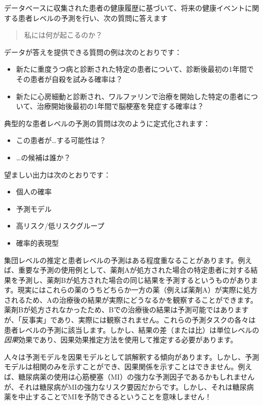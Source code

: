 \documentclass[
  11pt]{book}
\makeatletter
\providecommand{\tightlist}{%
  \setlength{\itemsep}{0pt}\setlength{\parskip}{0pt}}
\newenvironment{kframe}{%
\medskip{}
\setlength{\fboxsep}{.8em}
 \def\at@end@of@kframe{}%
 \ifinner\ifhmode%
  \def\at@end@of@kframe{\end{minipage}}%
  \begin{minipage}{\columnwidth}%
 \fi\fi%
 \def\FrameCommand##1{\hskip\@totalleftmargin \hskip-\fboxsep
 \colorbox{myShadeColor}{##1}\hskip-\fboxsep
     \hskip-\linewidth \hskip-\@totalleftmargin \hskip\columnwidth}%
 \MakeFramed {\advance\hsize-\width
   \@totalleftmargin\z@ \linewidth\hsize
   \@setminipage}}%
 {\par\unskip\endMakeFramed%
 \at@end@of@kframe}
\newenvironment{rmdblock}[1]
  {
  \begin{itemize}
  \renewcommand{\labelitemi}{
    \raisebox{-.7\height}[0pt][0pt]{
      {\setkeys{Gin}{width=3em,keepaspectratio}\texttt{[image: images/\#1]}}
    }
  }
  \setlength{\fboxsep}{1em}
  \begin{kframe}
  \item
  }
  {
  \end{kframe}
  \end{itemize}
  }
\newenvironment{rmdimportant}
  {\begin{rmdblock}{important}}
  {\end{rmdblock}}
\theoremstyle{definition}
\theoremstyle{definition}
\theoremstyle{definition}
\theoremstyle{definition}
\theoremstyle{remark}
\makeatother
\begin{document}

データベースに収集された患者の健康履歴に基づいて、将来の健康イベントに関する患者レベルの予測を行い、次の質問に答えます

\begin{quote}
私には何が起こるのか？
\end{quote}

データが答えを提供できる質問の例は次のとおりです：

\begin{itemize}
\tightlist
\item
  新たに重度うつ病と診断された特定の患者について、診断後最初の1年間でその患者が自殺を試みる確率は？
\item
  新たに心房細動と診断され、ワルファリンで治療を開始した特定の患者について、治療開始後最初の1年間で脳梗塞を発症する確率は？
\end{itemize}

典型的な患者レベルの予測の質問は次のように定式化されます：

\begin{itemize}
\tightlist
\item
  この患者が\ldots する可能性は？
\item
  \ldots の候補は誰か？
\end{itemize}

望ましい出力は次のとおりです：

\begin{itemize}
\tightlist
\item
  個人の確率
\item
  予測モデル
\item
  高リスク/低リスクグループ
\item
  確率的表現型
\end{itemize}

集団レベルの推定と患者レベルの予測はある程度重なることがあります。例えば、重要な予測の使用例として、薬剤Aが処方された場合の特定患者に対する結果を予測し、薬剤Bが処方された場合の同じ結果を予測するというものがあります。現実にはこれらの薬のうちどちらか一方の薬（例えば薬剤A）が実際に処方されるため、Aの治療後の結果が実際にどうなるかを観察することができます。薬剤Bが処方されなかったため、Bでの治療後の結果は予測可能ではありますが、「反事実」であり、実際には観察されません。これらの予測タスクの各々は患者レベルの予測に該当します。しかし、結果の差（または比）は単位レベルの\emph{因果}効果であり、因果効果推定方法を使用して推定する必要があります。

\begin{rmdimportant}
人々は予測モデルを因果モデルとして誤解釈する傾向があります。しかし、予測モデルは相関のみを示すことができ、因果関係を示すことはできません。例えば、糖尿病薬の使用は心筋梗塞（MI）の強力な予測因子であるかもしれませんが、それは糖尿病がMIの強力なリスク要因だからです。しかし、それは糖尿病薬を中止することでMIを予防できるということを意味しません！
\end{rmdimportant}
\end{document}
